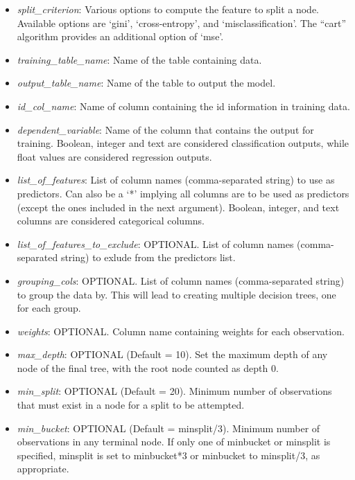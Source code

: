 \begin{itemize}
    \item \emph{split\_criterion}: Various options to compute the feature
    to split a node. Available options are `gini', `cross-entropy', and
    `misclassification'.
    The ``cart'' algorithm provides an additional option of `mse'.
    \item \emph{training\_table\_name}: Name of the table containing data.
    \item \emph{output\_table\_name}: Name of the table to output the model.
    \item \emph{id\_col\_name}: Name of column containing the id information in training data.
    \item \emph{dependent\_variable}: Name of the column that contains the
    output for training. Boolean, integer and text are considered classification
    outputs, while float values are considered regression outputs.
    \item \emph{list\_of\_features}: List of column names (comma-separated string)
    to use as predictors. Can also be a `*' implying all columns are to be used
    as predictors (except the ones included in the next argument). Boolean, integer, and
    text columns are considered categorical columns.
    \item \emph{list\_of\_features\_to\_exclude}: OPTIONAL. List of column names (comma-separated string)
    to exlude from the predictors list.
    \item \emph{grouping\_cols}: OPTIONAL. List of column names (comma-separated string) to group
    the data by. This will lead to creating multiple decision trees, one for each group.
    \item \emph{weights}: OPTIONAL. Column name containing weights for each observation.
    \item \emph{max\_depth}: OPTIONAL (Default = 10). Set the maximum depth of
    any node of the final tree, with the root node counted as depth 0.
    \item \emph{min\_split}: OPTIONAL (Default = 20). Minimum number of observations that
    must exist in a node for a split to be attempted.
    \item \emph{min\_bucket}: OPTIONAL (Default = minsplit/3). Minimum number of observations
    in any terminal node. If only one of minbucket or minsplit is specified,
    minsplit is set to minbucket*3 or minbucket to minsplit/3, as appropriate.

\end{itemize}
